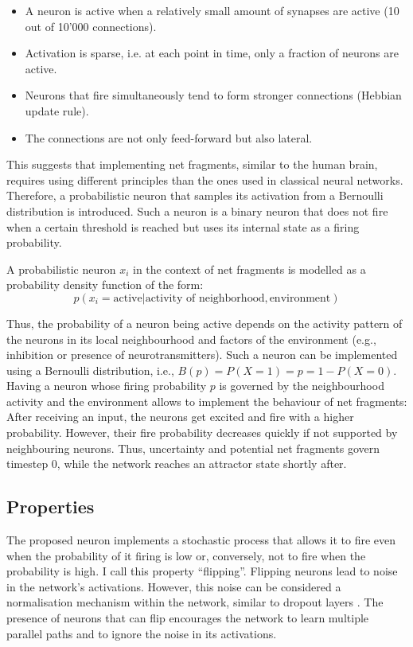 \begin{itemize}
    \item A neuron is active when a relatively small amount of synapses are active (10 out of 10'000 connections). 
    \item Activation is sparse, i.e. at each point in time, only a fraction of neurons are active.
    \item Neurons that fire simultaneously tend to form stronger connections (Hebbian update rule).
    \item The connections are not only feed-forward but also lateral.
\end{itemize}

This suggests that implementing net fragments, similar to the human brain, requires using different principles than the ones used in classical neural networks. Therefore, a probabilistic neuron that samples its activation from a Bernoulli distribution is introduced.
Such a neuron is a binary neuron that does not fire when a certain threshold is reached but uses its internal state as a firing probability.

A probabilistic neuron $x_i$ in the context of net fragments is modelled as a probability density function of the form:
\begin{equation}
    p(x_i = \text{active} | \text{activity of neighborhood}, \text{environment}) 
\end{equation}

Thus, the probability of a neuron being active depends on the activity pattern of the neurons in its local neighbourhood and factors of the environment (e.g., inhibition or presence of neurotransmitters).
Such a neuron can be implemented using a Bernoulli distribution, i.e., $B(p) = P(X = 1) = p = 1 - P(X=0)$. Having a neuron whose firing probability $p$ is governed by the neighbourhood activity and the environment allows to implement the behaviour of net fragments: After receiving an input, the neurons get excited and fire with a higher probability. However, their fire probability decreases quickly if not supported by neighbouring neurons. Thus, uncertainty and potential net fragments govern timestep 0, while the network reaches an attractor state shortly after. 

\subsection{Properties}
The proposed neuron implements a stochastic process that allows it to fire even when the probability of it firing is low or, conversely, not to fire when the probability is high.
I call this property ``flipping''.
Flipping neurons lead to noise in the network's activations.
However, this noise can be considered a normalisation mechanism within the network, similar to dropout layers .
The presence of neurons that can flip encourages the network to learn multiple parallel paths and to ignore the noise in its activations.


